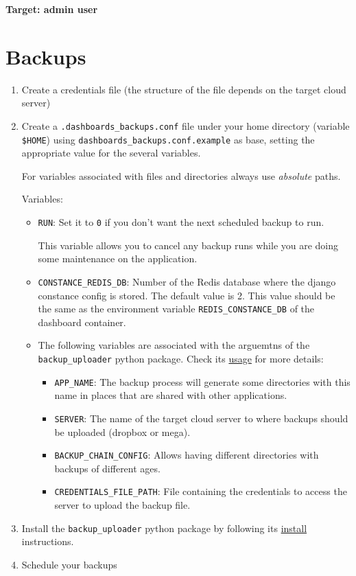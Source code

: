\documentclass[
]{book}
\begin{document}
\textbf{Target: admin user}

\hypertarget{backups}{%
\chapter{Backups}\label{backups}}

\begin{enumerate}
\def\labelenumi{\arabic{enumi}.}
\item
  Create a credentials file (the structure of the file depends on the target cloud server)
\item
  Create a \texttt{.dashboards\_backups.conf} file under your home directory (variable \texttt{\$HOME}) using \texttt{dashboards\_backups.conf.example} as base, setting the appropriate value for the several variables.

  For variables associated with files and directories always use \emph{absolute} paths.

  Variables:

  \begin{itemize}
  \item
    \texttt{RUN}: Set it to \texttt{0} if you don't want the next scheduled backup to run.

    This variable allows you to cancel any backup runs while you are doing some maintenance on the application.
  \item
    \texttt{CONSTANCE\_REDIS\_DB}: Number of the Redis database where the django constance config is stored. The default value is 2. This value should be the same as the environment variable \texttt{REDIS\_CONSTANCE\_DB} of the dashboard container.
  \item
    The following variables are associated with the arguemtns of the \texttt{backup\_uploader} python package. Check its \href{https://github.com/aspedrosa/BackupUploader\#usage}{usage} for more details:

    \begin{itemize}
    \item
      \texttt{APP\_NAME}: The backup process will generate some directories with this name in places that are shared with other applications.
    \item
      \texttt{SERVER}: The name of the target cloud server to where backups should be uploaded (dropbox or mega).
    \item
      \texttt{BACKUP\_CHAIN\_CONFIG}: Allows having different directories with backups of different ages.
    \item
      \texttt{CREDENTIALS\_FILE\_PATH}: File containing the credentials to access the server to upload the backup file.
    \end{itemize}
  \end{itemize}
\item
  Install the \texttt{backup\_uploader} python package by following its \href{https://github.com/aspedrosa/BackupUploader\#install}{install} instructions.
\item
  Schedule your backups


\end{enumerate}
\end{document}
